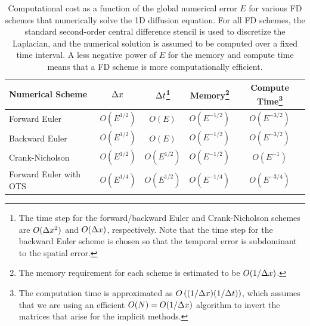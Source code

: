 \documentclass[oneeqnum,onefignum,onetabnum,onethmnum]{siamltex}
\begin{document}
\begin{table}[tbh]
\caption{\label{tab:comp_perf_vs_err} 
   Computational cost as a function of the global numerical error $E$
   for various FD schemes that numerically solve the 1D diffusion equation.  
   For all FD schemes, the standard second-order central difference 
   stencil is used to discretize the Laplacian, and the numerical 
   solution is assumed to be computed over a fixed time interval.  
A less negative power of $E$ 
   for the memory and compute time means that a FD scheme is more 
   computationally efficient.
}
\begin{minipage}{\textwidth}
\begin{center} \footnotesize
\renewcommand{\arraystretch}{1.5}
\begin{tabular}{|l|c|c|c|c|}
  \hline
  {\bf Numerical Scheme} & $\Delta x$ 
  & $\Delta t$\footnote{The 
   time step for the forward/backward Euler and Crank-Nicholson schemes 
   are $O(\Delta x^2)$ and $O(\Delta x)$, respectively.  Note that the 
   time step for the backward Euler scheme is chosen so that the temporal 
   error is subdominant to the spatial error.}
  & {\bf Memory}\footnote{The memory requirement for each scheme is estimated 
    to be $O(1/\Delta x)$.} 
  & {\bf Compute Time}\footnote{The computation time is approximated as 
    $O\left( (1/\Delta x) (1/\Delta t) \right)$, which assumes that we are using an 
    efficient $O(N) = O(1/\Delta x)$ algorithm to invert the matrices that 
    arise for the implicit methods.}  \\
  \hline 
  Forward Euler    & $O\left( E^{1/2} \right)$ 
                   & $O\left (E \right)$ 
                   & $O\left( E^{-1/2} \right)$ 
                   & $O\left( E^{-3/2} \right)$ \\
  Backward Euler   & $O\left( E^{1/2} \right)$ 
                   & $O\left( E \right)$ 
                   & $O\left( E^{-1/2} \right)$ 
                   & $O\left( E^{-3/2} \right)$ \\
  Crank-Nicholson  & $O\left( E^{1/2} \right)$ 
                   & $O\left( E^{1/2} \right)$ 
                   & $O\left( E^{-1/2} \right)$ 
                   & $O\left( E^{-1} \right)$ \\
  Forward Euler with OTS  & $O\left( E^{1/4} \right)$ 
                   & $O\left( E^{1/2} \right)$ 
                   & $O\left( E^{-1/4} \right)$ 
                   & $O\left( E^{-3/4} \right)$ \\ 
  \hline
\end{tabular}
\end{center}
\end{minipage}
\end{table}
\end{document}
